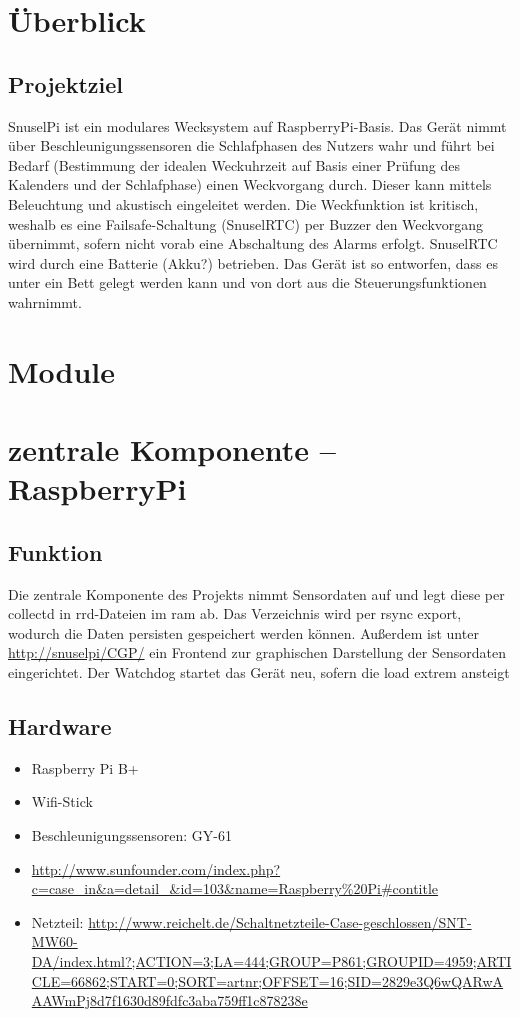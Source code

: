 \documentclass[a4paper,twoside,titlepage,normalheadings,tocleft,bibtotoc]{scrartcl}
\begin{document}
%
\tableofcontents
\newpage

\section{Überblick}
\subsection{Projektziel}
SnuselPi ist ein modulares Wecksystem auf RaspberryPi-Basis. Das Gerät nimmt über Beschleunigungssensoren die Schlafphasen des Nutzers wahr und führt bei Bedarf (Bestimmung der idealen Weckuhrzeit auf Basis einer Prüfung des Kalenders und der Schlafphase) einen Weckvorgang durch. Dieser kann mittels Beleuchtung und akustisch eingeleitet werden. Die Weckfunktion ist kritisch, weshalb es eine Failsafe-Schaltung (SnuselRTC) per Buzzer den Weckvorgang übernimmt, sofern nicht vorab eine Abschaltung des Alarms erfolgt. SnuselRTC wird durch eine Batterie (Akku?) betrieben.
Das Gerät ist so entworfen, dass es unter ein Bett gelegt werden kann und von dort aus die Steuerungsfunktionen wahrnimmt.
\section{Module}
\section{zentrale Komponente -- RaspberryPi}
\subsection{Funktion}
Die zentrale Komponente des Projekts nimmt Sensordaten auf und legt diese per collectd in rrd-Dateien im ram ab. Das Verzeichnis wird per rsync export, wodurch die Daten persisten gespeichert werden können. Außerdem ist unter \url{http://snuselpi/CGP/} ein Frontend zur graphischen Darstellung der Sensordaten eingerichtet. Der Watchdog startet das Gerät neu, sofern die load extrem ansteigt


\subsection{Hardware}
\begin{itemize}
\item Raspberry Pi B+
\item Wifi-Stick
\item Beschleunigungssensoren:  GY-61
\item \url{http://www.sunfounder.com/index.php?c=case_in&a=detail_&id=103&name=Raspberry%20Pi#contitle}
\item Netzteil: \url{http://www.reichelt.de/Schaltnetzteile-Case-geschlossen/SNT-MW60-DA/index.html?;ACTION=3;LA=444;GROUP=P861;GROUPID=4959;ARTICLE=66862;START=0;SORT=artnr;OFFSET=16;SID=2829e3Q6wQARwAAAWmPj8d7f1630d89fdfc3aba759ff1c878238e}
\end{itemize}
\end{document}

